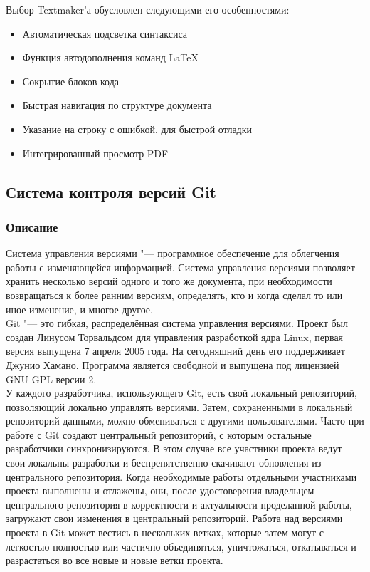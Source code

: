 \documentclass{article}
\begin{document}
			Выбор Textmaker'а обусловлен следующими его особенностями:
			\begin{itemize} 
	    		\item	Автоматическая подсветка синтаксиса
	    		\item	Функция автодополнения команд \LaTeX
	    		\item	Сокрытие блоков кода 
	    		\item	Быстрая навигация по структуре документа
	    		\item	Указание на строку с ошибкой, для быстрой отладки
	    		\item	Интегрированный просмотр PDF
			\end{itemize} 
	\newpage
	\subsection{Система контроля версий Git}
		\subsubsection{Описание}
		Система управления версиями "--- программное обеспечение для облегчения работы с изменяющейся информацией. Система управления версиями позволяет хранить несколько версий одного и того же документа, при необходимости возвращаться к более ранним версиям, определять, кто и когда сделал то или иное изменение, и многое другое.\\
		
		Git "--- это гибкая, распределённая система управления версиями. Проект был создан Линусом Торвальдсом для управления разработкой ядра Linux, первая версия выпущена 7 апреля 2005 года. На сегодняшний день его поддерживает Джунио Хамано. Программа является свободной и выпущена под лицензией GNU GPL версии 2.\\ 
		
	У каждого разработчика, использующего Git, есть свой локальный репозиторий, позволяющий локально управлять версиями. Затем, сохраненными в локальный репозиторий данными, можно обмениваться с другими пользователями. Часто при работе с Git создают центральный репозиторий, с которым остальные разработчики синхронизируются. В этом случае все участники проекта ведут свои локальны разработки и беспрепятственно скачивают обновления из центрального репозитория. Когда необходимые работы отдельными участниками проекта выполнены и отлажены, они, после удостоверения владельцем центрального репозитория в корректности и актуальности проделанной работы, загружают свои изменения в центральный репозиторий. Работа над версиями проекта в Git может вестись в нескольких ветках, которые затем могут с легкостью полностью или частично объединяться, уничтожаться, откатываться и разрастаться во все новые и новые ветки проекта.\\
\end{document}
